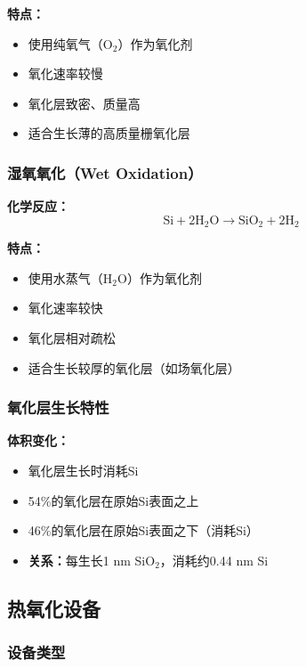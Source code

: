 \documentclass[UTF8,12pt,a4paper]{ctexart}
\begin{document}
\textbf{特点：}
\begin{itemize}
    \item 使用纯氧气（O$_2$）作为氧化剂
    \item 氧化速率较慢
    \item 氧化层致密、质量高
    \item 适合生长薄的高质量栅氧化层
\end{itemize}

\subsubsection{湿氧氧化（Wet Oxidation）}

\textbf{化学反应：}
\begin{equation}
\text{Si} + 2\text{H}_2\text{O} \rightarrow \text{SiO}_2 + 2\text{H}_2
\end{equation}

\textbf{特点：}
\begin{itemize}
    \item 使用水蒸气（H$_2$O）作为氧化剂
    \item 氧化速率较快
    \item 氧化层相对疏松
    \item 适合生长较厚的氧化层（如场氧化层）
\end{itemize}

\subsubsection{氧化层生长特性}

\textbf{体积变化：}
\begin{itemize}
    \item 氧化层生长时消耗Si
    \item 54\%的氧化层在原始Si表面之上
    \item 46\%的氧化层在原始Si表面之下（消耗Si）
    \item \textbf{关系：}每生长1 nm SiO$_2$，消耗约0.44 nm Si
\end{itemize}

\subsection{热氧化设备}

\subsubsection{设备类型}
\end{document}
